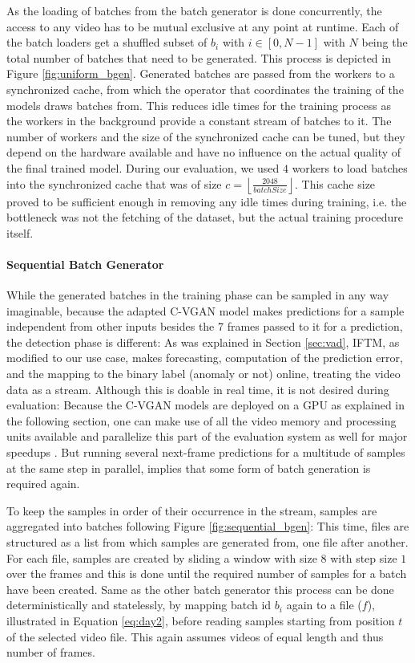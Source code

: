 As the loading of batches from the batch generator is done concurrently, the access to any video has to be mutual exclusive at any point at runtime. Each of the batch loaders get a shuffled subset of $b_i$ with $i \in [0,N-1]$ with $N$ being the total number of batches that need to be generated. This process is depicted in Figure \ref{fig:uniform_bgen}. Generated batches are passed from the workers to a synchronized cache, from which the operator that coordinates the training of the models draws batches from. This reduces idle times for the training process as the workers in the background provide a constant stream of batches to it. The number of workers and the size of the synchronized cache can be tuned, but they depend on the hardware available and have no influence on the actual quality of the final trained model. During our evaluation, we used $4$ workers to load batches into the synchronized cache that was of size $c = \left \lfloor {\frac{2048}{batchSize}} \right \rfloor$. This cache size proved to be sufficient enough in removing any idle times during training, i.e. the bottleneck was not the fetching of the dataset, but the actual training procedure itself.

\paragraph{Sequential Batch Generator} \label{par:sequential_bgen}

While the generated batches in the training phase can be sampled in any way imaginable, because the adapted C-VGAN model makes predictions for a sample independent from other inputs besides the 7 frames passed to it for a prediction, the detection phase is different: As was explained in Section \ref{sec:vad}, IFTM, as modified to our use case, makes forecasting, computation of the prediction error, and the mapping to the binary label (anomaly or not) online, treating the video data as a stream. Although this is doable in real time, it is not desired during evaluation: Because the C-VGAN models are deployed on a GPU as explained in the following section, one can make use of all the video memory and processing units available and parallelize this part of the evaluation system as well for major speedups \cite{owens2008gpu, abadi2016tensorflow}. But running several next-frame predictions for a multitude of samples at the same step in parallel, implies that some form of batch generation is required again. 

To keep the samples in order of their occurrence in the stream, samples are aggregated into batches following Figure \ref{fig:sequential_bgen}: This time, files are structured as a list from which samples are generated from, one file after another. For each file, samples are created by sliding a window with size $8$ with step size $1$ over the frames and this is done until the required number of samples for a batch have been created. Same as the other batch generator this process can be done deterministically and statelessly, by mapping batch id $b_i$ again to a file ($f$), illustrated in Equation \ref{eq:day2}, before reading samples starting from position $t$ of the selected video file. This again assumes videos of equal length and thus number of frames.

